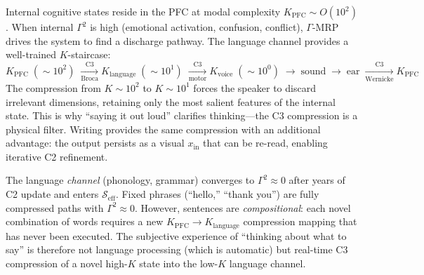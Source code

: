 \documentclass[aps,pre,twocolumn,superscriptaddress,floatfix]{revtex4-2}
\begin{document}
\begin{remark}
\label{rem:self-talk}
Internal cognitive states reside in the PFC at modal
complexity $K_{\text{PFC}} \sim O(10^2)$.
When internal $\Gamma^2$ is high (emotional activation,
confusion, conflict), $\Gamma$-MRP drives the system to
find a discharge pathway.
The language channel provides a well-trained
$K$-staircase:
\[
  K_{\text{PFC}} \;(\sim 10^2)
  \;\xrightarrow[\text{Broca}]{\text{C3}}
  K_{\text{language}} \;(\sim 10^1)
  \;\xrightarrow[\text{motor}]{\text{C3}}
  K_{\text{voice}} \;(\sim 10^0)
  \;\to\; \text{sound}
  \;\to\; \text{ear}
  \;\xrightarrow[\text{Wernicke}]{\text{C3}}
  K_{\text{PFC}}
\]
The compression from $K \sim 10^2$ to $K \sim 10^1$
forces the speaker to discard irrelevant dimensions,
retaining only the most salient features of the
internal state.
This is why ``saying it out loud'' clarifies
thinking---the C3 compression is a physical filter.
Writing provides the same compression with an
additional advantage: the output persists as a visual
$x_{\text{in}}$ that can be re-read, enabling
iterative C2 refinement.
\end{remark}

\begin{remark}
\label{rem:language-compositionality}
The language \emph{channel} (phonology, grammar)
converges to $\Gamma^2 \approx 0$ after years of C2
update and enters $\mathcal{S}_{\text{eff}}$.
Fixed phrases (``hello,'' ``thank you'') are
fully compressed paths with $\Gamma^2 \approx 0$.
However, sentences are \emph{compositional}: each
novel combination of words requires a new
$K_{\text{PFC}} \to K_{\text{language}}$ compression
mapping that has never been executed.
The subjective experience of ``thinking about what to
say'' is therefore not language processing
(which is automatic) but real-time C3 compression of a
novel high-$K$ state into the low-$K$ language channel.
\end{remark}
\end{document}
